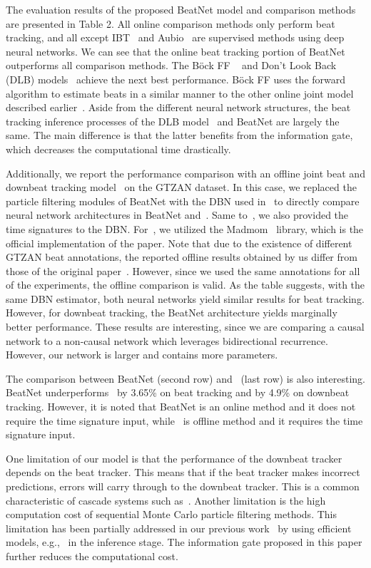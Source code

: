 \documentclass{article}
\begin{document}
The evaluation results of the proposed BeatNet model and comparison methods are presented in Table 2. All online comparison methods only perform beat tracking, and all except IBT~\cite{Oliveria} and Aubio~\cite{Brossier} are supervised methods using deep neural networks. We can see that the online beat tracking portion of BeatNet outperforms all comparison methods. The Böck FF ~\cite{Bock:1,Bock:3} and Don't Look Back (DLB) models~\cite{Heydari} achieve the next best performance. Böck FF uses the forward algorithm to estimate beats in a similar manner to the other online joint model described earlier~\cite{Bock:5}. Aside from the different neural network structures, the beat tracking inference processes of the DLB model~\cite{Heydari} and BeatNet are largely the same. The main difference is that the latter benefits from the information gate, which decreases the computational time drastically.

Additionally, we report the performance comparison with an offline joint beat and downbeat tracking model~\cite{Bock:1} on the GTZAN dataset. In this case, we replaced the particle filtering modules of BeatNet with the DBN used in~\cite{Bock:1} to directly compare neural network architectures in BeatNet and~\cite{Bock:1}. Same to~\cite{Bock:1}, we also provided the time signatures to the DBN. For~\cite{Bock:1}, we utilized the Madmom~\cite{bock:06} library, which is the official implementation of the paper.
Note that due to the existence of different GTZAN beat annotations, the reported offline results obtained by us differ from those of the original paper~\cite{Bock:1}. However, since we used the same annotations for all of the experiments, the offline comparison is valid.
As the table suggests, with the same DBN estimator, both neural networks yield similar results for beat tracking. However, for downbeat tracking, the BeatNet architecture yields marginally better performance. These results are interesting, since we are comparing a causal network to a non-causal network which leverages bidirectional recurrence. However, our network is larger and contains more parameters. 

The comparison between BeatNet (second row) and~\cite{Bock:1} (last row) is also interesting. BeatNet underperforms~\cite{Bock:1} by 3.65\% on beat tracking and by 4.9\% on downbeat tracking. However, it is noted that BeatNet is an online method and it does not require the time signature input, while~\cite{Bock:1} is offline method and it requires the time signature input.

One limitation of our model is that the performance of the downbeat tracker depends on the beat tracker. This means that if the beat tracker makes incorrect predictions, errors will carry through to the downbeat tracker. This is a common characteristic of cascade systems such as~\cite{Bock:5}. Another limitation is the high computation cost of sequential Monte Carlo particle filtering methods. This limitation has been partially addressed in our previous work~\cite{Heydari} by using efficient models, e.g.,~\cite{Krebs:2} in the inference stage. The information gate proposed in this paper further reduces the computational cost.
\end{document}
